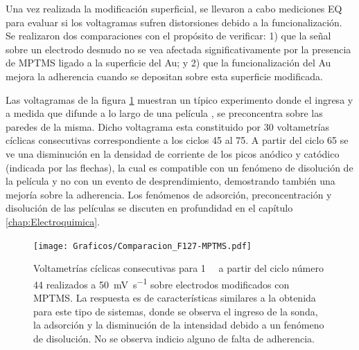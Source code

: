 			 Una vez realizada la modificación superficial, se llevaron a cabo mediciones EQ para evaluar si los voltagramas sufren distorsiones debido a la funcionalización. Se realizaron dos comparaciones con el propósito de verificar: 1) que la señal sobre un electrodo desnudo no se vea afectada significativamente por la presencia de MPTMS ligado a la superficie del Au; y 2) que la funcionalización del Au mejora la adherencia cuando se depositan \pdm\space sobre esta superficie modificada.

             Las voltagramas de la figura \ref{fig:comparaciones_MPTMS-B} muestran un típico experimento donde el \aminorutenio\space ingresa y a medida que difunde a lo largo de una película \pdmF, se preconcentra sobre las paredes de la misma. Dicho voltagrama esta constituido por 30 voltametrías cíclicas consecutivas correspondiente a los ciclos 45 al 75. A partir del ciclo 65 se ve una disminución en la densidad de corriente de los picos anódico y catódico (indicada por las flechas), la cual es compatible con un fenómeno de disolución de la película y no con un evento de desprendimiento, demostrando también una mejoría sobre la adherencia. Los fenómenos de adsorción, preconcentración y disolución de las películas se discuten en profundidad en el capítulo \ref{chap:Electroquimica}.


             	\begin{figure}[!ht]
							\begin{center}
				 	   	    \texttt{[image: Graficos/Comparacion\_F127-MPTMS.pdf]}
				       		\caption[Comparación de superficies con y sin MPTMS.]{Voltametrías cíclicas consecutivas para \aminorutenio\space \SI{1}{\milli\Molar} a partir del ciclo número 44 realizados a \SI{50}{\milli\volt.\second^{-1}} sobre electrodos modificados con MPTMS. La respuesta es de características similares a la obtenida para este tipo de sistemas, donde se observa el ingreso de la sonda, la adsorción y la disminución de la intensidad debido a un fenómeno de disolución. No se observa indicio alguno de falta de adherencia.}
						 \label{fig:comparaciones_MPTMS-B}	
					    \end{center}
					    \end{figure}
				
